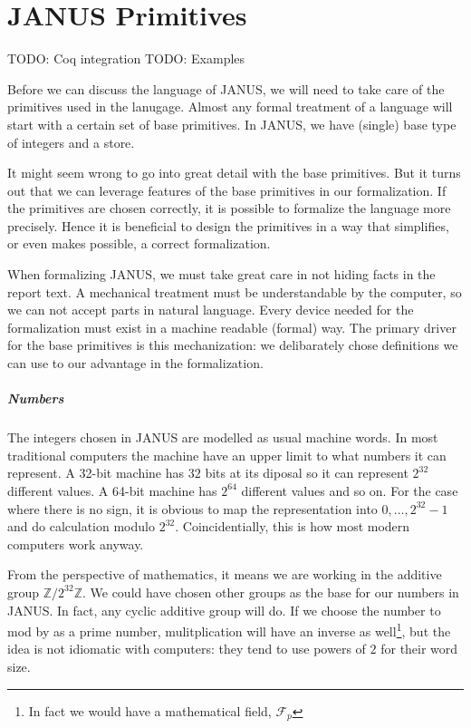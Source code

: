 \chapter{JANUS Primitives}

TODO: Coq integration
TODO: Examples

Before we can discuss the language of JANUS, we will need to take care
of the primitives used in the lanugage. Almost any formal treatment of
a language will start with a certain set of base primitives. In JANUS,
we have (single) base type of integers and a store.

It might seem wrong to go into great detail with the base
primitives. But it turns out that we can leverage features of the base
primitives in our formalization. If the primitives are chosen
correctly, it is possible to formalize the language more
precisely. Hence it is beneficial to design the primitives in a way
that simplifies, or even makes possible, a correct formalization.

When formalizing JANUS, we must take great care in not hiding facts in
the report text. A mechanical treatment must be understandable by the
computer, so we can not accept parts in natural language. Every device
needed for the formalization must exist in a machine readable (formal)
way. The primary driver for the base primitives is this mechanization:
we delibarately chose definitions we can use to our advantage in the
formalization.

\paragraph{Numbers}

The integers chosen in JANUS are modelled as usual machine words. In
most traditional computers the machine have an upper limit to what
numbers it can represent. A 32-bit machine has $32$ bits at its
diposal so it can represent $2^{32}$ different values. A 64-bit
machine has $2^{64}$ different values and so on. For the case where
there is no sign, it is obvious to map the representation into $0,
\dotsc, 2^{32}-1$ and do calculation modulo $2^{32}$. Coincidentially,
this is how most modern computers work anyway.

From the perspective of mathematics, it means we are working in the
additive group $\mathbb{Z}/2^{32}\mathbb{Z}$. We could have chosen
other groups as the base for our numbers in JANUS. In fact, any cyclic
additive group will do. If we choose the number to mod by as a prime
number, mulitplication will have an inverse as well\footnote{In fact
  we would have a mathematical field, $\mathcal{F}_p$}, but the idea
is not idiomatic with computers: they tend to use powers of $2$ for
their word size.

